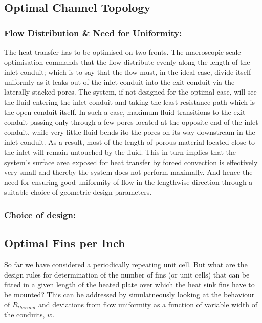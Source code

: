 \documentclass[twocolumn,10pt,cleanfoot]{ihmtc}
\begin{document}
\subsection{Optimal Channel Topology}\label{choiceofdesign}
\subsubsection*{Flow Distribution \& Need for Uniformity:} The heat transfer has to be optimised on two fronts. The macroscopic scale optimisation commands that the flow distribute evenly along the length of the inlet conduit; which is to say that the flow must, in the ideal case, divide itself uniformly as it leaks out of the inlet conduit into the exit conduit via the laterally stacked pores. The system, if not designed for the optimal case, will see the fluid entering the inlet conduit and taking the least resistance path which is the open conduit itself. In such a case, maximum fluid transitions to the exit conduit passing only through a few pores located at the opposite end of the inlet conduit, while very little fluid bends ito the pores on its way downstream in the inlet conduit. As a result, most of the length of porous material located close to the inlet will remain untouched by the fluid. This in turn implies that the system's surface area exposed for heat transfer by forced convection is effectively very small and thereby the system does not perform maximally. And hence the need for ensuring good uniformity of flow in the lengthwise direction through a suitable choice of geometric design parameters.
\subsubsection*{Choice of design:}


\subsection{Optimal Fins per Inch}\label{fpi}
So far we have considered a periodically repeating unit cell. But what are the design rules for determination of the number of fins (or unit cells) that can be fitted in a given length of the heated plate over which the heat sink fins have to be mounted? This can be addressed by simulatneously looking at the behaviour of $R_{thermal}$ and deviations from flow uniformity as a function of variable width of the conduits, $w$.





\end{document}
